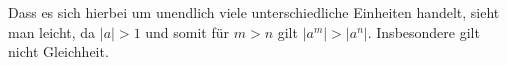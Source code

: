 \begin{solution}
\begin{itemize}
  Dass es sich hierbei um unendlich viele unterschiedliche Einheiten handelt, sieht man leicht, da $|a|>1$ und somit für $m>n$ gilt $|a^m|>|a^n|$. Insbesondere gilt nicht Gleichheit.

\end{itemize}

\end{solution}

